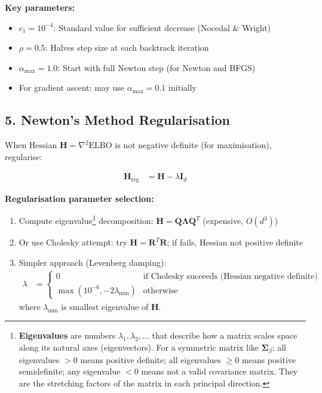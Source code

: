 \documentclass[11pt,a4paper]{article}
\newcommand{\ELBO}{\text{ELBO}}
\begin{document}
\textbf{Key parameters:}
\begin{itemize}
\item $c_1 = 10^{-4}$: Standard value for sufficient decrease (Nocedal \& Wright)
\item $\rho = 0.5$: Halves step size at each backtrack iteration
\item $\alpha_{\max} = 1.0$: Start with full Newton step (for Newton and BFGS)
\item For gradient ascent: may use $\alpha_{\max} = 0.1$ initially
\end{itemize}

\subsection*{5. Newton's Method Regularisation}

When Hessian $\bm{H} = \nabla^2 \ELBO$ is not negative definite (for maximisation), regularise:

\begin{align}
\bm{H}_{\text{reg}} &= \bm{H} - \lambda \bm{I}_d
\end{align}

\textbf{Regularisation parameter selection:}

\begin{enumerate}
\item Compute eigenvalue\footnote{\textbf{Eigenvalues} are numbers $\lambda_1, \lambda_2, \ldots$ that describe how a matrix scales space along its natural axes (eigenvectors). For a symmetric matrix like $\bm{\Sigma}_\beta$: all eigenvalues $> 0$ means positive definite; all eigenvalues $\geq 0$ means positive semidefinite; any eigenvalue $< 0$ means not a valid covariance matrix. They are the stretching factors of the matrix in each principal direction.} decomposition: $\bm{H} = \bm{Q} \bm{\Lambda} \bm{Q}^T$ (expensive, $O(d^3)$)
\item Or use Cholesky attempt: try $\bm{H} = \bm{R}^T \bm{R}$; if fails, Hessian not positive definite
\item Simpler approach (Levenberg damping):
\begin{align}
\lambda &= \begin{cases}
0 & \text{if Cholesky succeeds (Hessian negative definite)}\\
\max(10^{-6}, -2\lambda_{\min}) & \text{otherwise}
\end{cases}
\end{align}
where $\lambda_{\min}$ is smallest eigenvalue of $\bm{H}$.
\end{enumerate}
\end{document}
